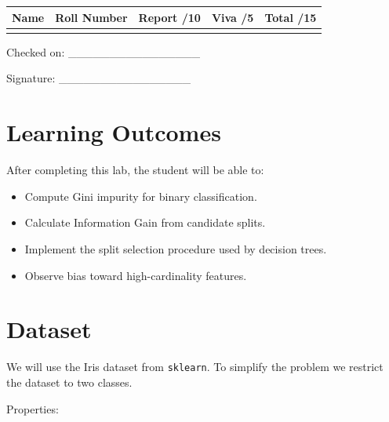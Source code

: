 \documentclass[12pt,a4paper]{article}
\begin{document}
\renewcommand{\arraystretch}{2.0}
\begin{tabularx}{\textwidth}{|Y|Y|Y|Y|Y|}
\hline
\textbf{Name} & \textbf{Roll Number} & \textbf{Report /10} & \textbf{Viva /5} & \textbf{Total /15} \\
\hline
 & & & & \\
\hline
\end{tabularx}
\renewcommand{\arraystretch}{1.0}

\vspace{12pt}

\begin{flushright}
Checked on: \_\_\_\_\_\_\_\_\_\_\_\_\_\_\_\_

\vspace{6pt}

Signature: \_\_\_\_\_\_\_\_\_\_\_\_\_\_\_\_
\end{flushright}

\newpage


\section{Learning Outcomes}

After completing this lab, the student will be able to:

\begin{itemize}
\item Compute Gini impurity for binary classification.
\item Calculate Information Gain from candidate splits.
\item Implement the split selection procedure used by decision trees.
\item Observe bias toward high-cardinality features.
\end{itemize}

\section{Dataset}

We will use the Iris dataset from \texttt{sklearn}.  
To simplify the problem we restrict the dataset to two classes.

Properties:
\end{document}
